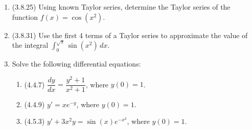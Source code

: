 \documentclass[12pt]{article}
\newcommand{\di}{\displaystyle}
\begin{document}
\begin{enumerate}
\begin{enumerate}
\end{enumerate}
\item (3.8.25) Using known Taylor series, determine the Taylor series of the function $f(x)=\cos(x^2)$.

\vspace{1.5in}

\item (3.8.31) Use the first 4 terms of a Taylor series to approximate the value of the integral $\di \int_0^{\sqrt{\pi}}\sin(x^2)\,dx$. 

\newpage

\item Solve the following differential equations:
\begin{enumerate}
\item (4.4.7) $\dfrac{dy}{dx} = \dfrac{y^2+1}{x^2+1}$, where $y(0)=1$.

\vspace{2.25in}

\item (4.4.9) $y' = xe^{-y}$, where $y(0)=1$.

\vspace{2.25in}

\item (4.5.3) $y'+3x^2y=\sin(x)e^{-x^2}$, where $y(0)=1$.
\end{enumerate}

\end{enumerate}
\end{document}
